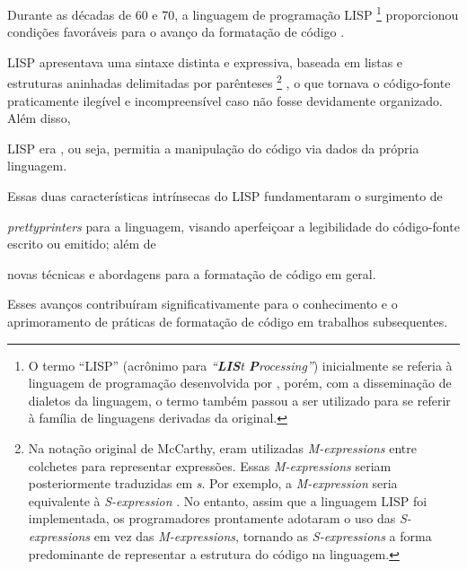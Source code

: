 \documentclass
  [11pt,a4paper,english,brazil,openright,sumario=tradicional,twoside]
  {abntex2}
\begin{document}
  Durante as décadas de 60 e 70, a linguagem de programação LISP%
  \footnote
    { O termo ``LISP'' (acrônimo para
      \textit{``\textbf{LIS}t \textbf{P}rocessing''}) inicialmente se referia à
      linguagem de programação desenvolvida por
      \textcite{mccarthy-1960-recursive}, porém, com a disseminação de dialetos
      da linguagem, o termo também passou a ser utilizado para se referir à
      família de linguagens derivadas da original.}
  proporcionou condições favoráveis para o avanço da formatação de código
  \cite[2]{yelland-2015-new}.
  \begin{inparaenum}
    \item LISP apresentava uma sintaxe distinta e expressiva, baseada em listas
          e estruturas aninhadas delimitadas por parênteses%
          \footnote
            { Na notação original de McCarthy, eram utilizadas
              \textit{M-expressions} entre colchetes para representar
              expressões. Essas \textit{M-expressions} seriam posteriormente
              traduzidas em \textit{s}. Por exemplo, a
              \textit{M-expression} \usebox{\mexpressionexample} seria
              equivalente à \textit{S-expression} \usebox{\sexpressionexample}.
              No entanto, assim que a linguagem LISP foi implementada, os
              programadores prontamente adotaram o uso das
              \textit{S-expressions} em vez das \textit{M-expressions},
              tornando as \textit{S-expressions} a forma predominante de
              representar a estrutura do código na linguagem.}%
          , o que tornava o código-fonte praticamente ilegível e
          incompreensível caso não fosse devidamente organizado. Além disso,
    \item LISP era , ou seja, permitia a manipulação do
          código via dados da própria linguagem.
  \end{inparaenum}
  Essas duas características intrínsecas do LISP fundamentaram o surgimento de
  \begin{inparaenum}
    \item \textit{prettyprinters} para a linguagem, visando aperfeiçoar a
          legibilidade do código-fonte escrito ou emitido; além de
    \item novas técnicas e abordagens para a formatação de código em geral.
  \end{inparaenum}
  Esses avanços contribuíram significativamente para o conhecimento e o
  aprimoramento de práticas de formatação de código em trabalhos subsequentes.
\end{document}

